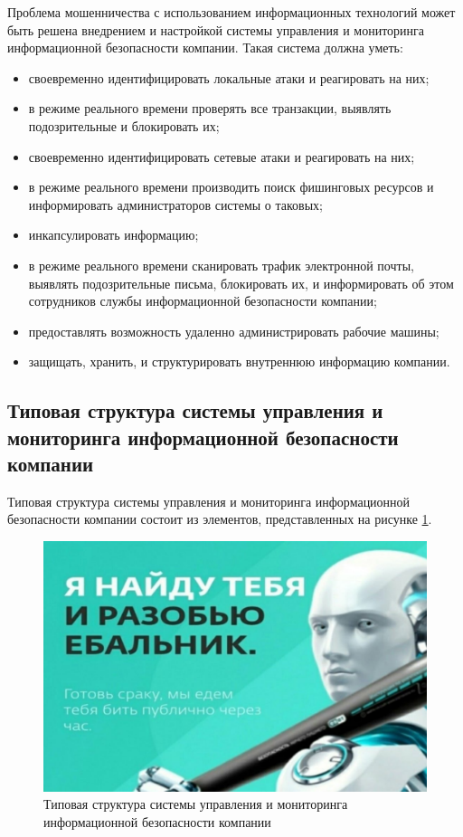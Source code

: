 Проблема мошенничества с использованием информационных технологий может быть решена внедрением и настройкой системы управления и мониторинга информационной безопасности компании. Такая система должна уметь:
\begin{itemize}
    \item своевременно идентифицировать локальные атаки и реагировать на них;
    \item в режиме реального времени проверять все транзакции, выявлять подозрительные и блокировать их;
    \item своевременно идентифицировать сетевые атаки и реагировать на них;
    \item в режиме реального времени производить поиск фишинговых ресурсов и информировать администраторов системы о таковых;
    \item инкапсулировать информацию;
    \item в режиме реального времени сканировать трафик электронной почты, выявлять подозрительные письма, блокировать их, и информировать об этом сотрудников службы информационной безопасности компании;
    \item предоставлять возможность удаленно администрировать рабочие машины;
    \item защищать, хранить, и структурировать внутреннюю информацию компании.
\end{itemize}


\subsection{Типовая структура системы управления и мониторинга информационной безопасности компании}

Типовая структура системы управления и мониторинга информационной безопасности компании состоит из элементов, представленных на рисунке \ref{structt}.

\begin{figure}[H]
  \centering
  \includegraphics[width=1\textwidth]{image/1.jpg}
  \caption{Типовая структура системы управления и мониторинга информационной безопасности компании}
  \label{structt}
\end{figure}


